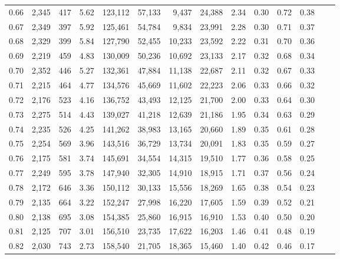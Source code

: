 \begin{tabular}{rrrrrrrrrrrrrr}
0.66 &  2,345 &    417 &    5.62 &  123,112 &   57,133 &   9,437 &  24,388 &  2.34 &  0.30 &  0.72 &      0.38 \\
0.67 &  2,349 &    397 &    5.92 &  125,461 &   54,784 &   9,834 &  23,991 &  2.28 &  0.30 &  0.71 &      0.37 \\
0.68 &  2,329 &    399 &    5.84 &  127,790 &   52,455 &  10,233 &  23,592 &  2.22 &  0.31 &  0.70 &      0.36 \\
0.69 &  2,219 &    459 &    4.83 &  130,009 &   50,236 &  10,692 &  23,133 &  2.17 &  0.32 &  0.68 &      0.34 \\
0.70 &  2,352 &    446 &    5.27 &  132,361 &   47,884 &  11,138 &  22,687 &  2.11 &  0.32 &  0.67 &      0.33 \\
0.71 &  2,215 &    464 &    4.77 &  134,576 &   45,669 &  11,602 &  22,223 &  2.06 &  0.33 &  0.66 &      0.32 \\
0.72 &  2,176 &    523 &    4.16 &  136,752 &   43,493 &  12,125 &  21,700 &  2.00 &  0.33 &  0.64 &      0.30 \\
0.73 &  2,275 &    514 &    4.43 &  139,027 &   41,218 &  12,639 &  21,186 &  1.95 &  0.34 &  0.63 &      0.29 \\
0.74 &  2,235 &    526 &    4.25 &  141,262 &   38,983 &  13,165 &  20,660 &  1.89 &  0.35 &  0.61 &      0.28 \\
0.75 &  2,254 &    569 &    3.96 &  143,516 &   36,729 &  13,734 &  20,091 &  1.83 &  0.35 &  0.59 &      0.27 \\
0.76 &  2,175 &    581 &    3.74 &  145,691 &   34,554 &  14,315 &  19,510 &  1.77 &  0.36 &  0.58 &      0.25 \\
0.77 &  2,249 &    595 &    3.78 &  147,940 &   32,305 &  14,910 &  18,915 &  1.71 &  0.37 &  0.56 &      0.24 \\
0.78 &  2,172 &    646 &    3.36 &  150,112 &   30,133 &  15,556 &  18,269 &  1.65 &  0.38 &  0.54 &      0.23 \\
0.79 &  2,135 &    664 &    3.22 &  152,247 &   27,998 &  16,220 &  17,605 &  1.59 &  0.39 &  0.52 &      0.21 \\
0.80 &  2,138 &    695 &    3.08 &  154,385 &   25,860 &  16,915 &  16,910 &  1.53 &  0.40 &  0.50 &      0.20 \\
0.81 &  2,125 &    707 &    3.01 &  156,510 &   23,735 &  17,622 &  16,203 &  1.46 &  0.41 &  0.48 &      0.19 \\
0.82 &  2,030 &    743 &    2.73 &  158,540 &   21,705 &  18,365 &  15,460 &  1.40 &  0.42 &  0.46 &      0.17 \\

\end{tabular}
